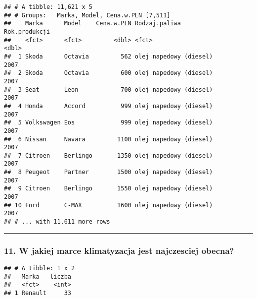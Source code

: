 \documentclass[]{article}
\newenvironment{Shaded}{\begin{snugshade}}{\end{snugshade}}
\newcommand{\KeywordTok}[1]{\textcolor[rgb]{0.13,0.29,0.53}{\textbf{#1}}}
\newcommand{\DataTypeTok}[1]{\textcolor[rgb]{0.13,0.29,0.53}{#1}}
\newcommand{\StringTok}[1]{\textcolor[rgb]{0.31,0.60,0.02}{#1}}
\newcommand{\OperatorTok}[1]{\textcolor[rgb]{0.81,0.36,0.00}{\textbf{#1}}}
\newcommand{\NormalTok}[1]{#1}
\begin{document}
\begin{verbatim}
## # A tibble: 11,621 x 5
## # Groups:   Marka, Model, Cena.w.PLN [7,511]
##    Marka      Model    Cena.w.PLN Rodzaj.paliwa          Rok.produkcji
##    <fct>      <fct>         <dbl> <fct>                          <dbl>
##  1 Skoda      Octavia         562 olej napedowy (diesel)          2007
##  2 Skoda      Octavia         600 olej napedowy (diesel)          2007
##  3 Seat       Leon            700 olej napedowy (diesel)          2007
##  4 Honda      Accord          999 olej napedowy (diesel)          2007
##  5 Volkswagen Eos             999 olej napedowy (diesel)          2007
##  6 Nissan     Navara         1100 olej napedowy (diesel)          2007
##  7 Citroen    Berlingo       1350 olej napedowy (diesel)          2007
##  8 Peugeot    Partner        1500 olej napedowy (diesel)          2007
##  9 Citroen    Berlingo       1550 olej napedowy (diesel)          2007
## 10 Ford       C-MAX          1600 olej napedowy (diesel)          2007
## # ... with 11,611 more rows
\end{verbatim}

\begin{center}\rule{0.5\linewidth}{\linethickness}\end{center}

\subsubsection{11. W jakiej marce klimatyzacja jest najczesciej
obecna?}\label{w-jakiej-marce-klimatyzacja-jest-najczesciej-obecna}

\begin{Shaded}
\end{Shaded}

\begin{verbatim}
## # A tibble: 1 x 2
##   Marka   liczba
##   <fct>    <int>
## 1 Renault     33
\end{verbatim}
\end{document}
